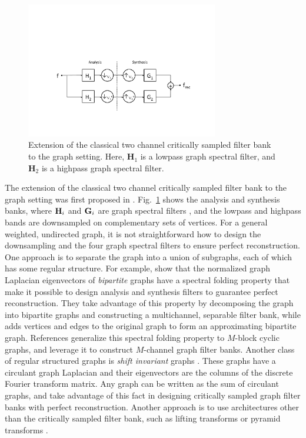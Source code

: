\documentclass[journal, 10pt]{IEEEtran}
\begin{document}
\begin{figure}[t]
\centerline{\includegraphics[width=3.3in]{fig_two_channel_classical}}
\caption{Extension of the classical two channel critically sampled filter bank to the graph setting. Here, $\mathbf{H}_1$ is a lowpass graph spectral filter, and $\mathbf{H}_2$ is a highpass graph spectral filter.}\label{Fig:two_channel}
\end{figure}


The extension of the classical two channel critically sampled filter bank to the graph setting was first proposed in \cite{narang_icip}. Fig.\ \ref{Fig:two_channel} shows the analysis and synthesis banks, where ${\bf H}_i$ and ${\bf G}_i$ are graph spectral filters \cite{shuman2013emerging}, and the lowpass and highpass bands are downsampled on complementary sets of vertices. For a general weighted, undirected graph, it is not straightforward %
how to design the downsampling and the four graph spectral filters to ensure perfect reconstruction. One approach is to separate the graph into a union of subgraphs, each of which has some regular structure. For example, \cite{narang2012perfect,narang_bior_filters} show that the normalized graph Laplacian eigenvectors of \emph{bipartite} graphs have a spectral folding property that make it possible to design analysis and synthesis filters to guarantee perfect reconstruction. They take advantage of this property by decomposing the graph into bipartite graphs and constructing a multichannel, separable filter bank, while \cite{sakiyama} adds vertices and edges to the original graph to form an approximating bipartite graph. References \cite{teke2016,teke2017ii} generalize this spectral folding property to $M$-block cyclic graphs, and leverage it to construct $M$-channel graph filter banks. Another class of regular structured graphs is \emph{shift invariant} graphs \cite[Chapter 5.1]{grady}. These graphs have a circulant graph Laplacian and their eigenvectors are the columns of the discrete Fourier transform matrix. Any graph can be written as the sum of circulant graphs, and \cite{ekambaram_icip,ekambaram2013globalsip,kotzagiannidis2016icassp} take advantage of this fact in designing critically sampled graph filter banks with perfect reconstruction. Another approach is to use architectures other than the critically sampled filter bank, such as lifting transforms \cite{jansen,narang_lifting_graphs} or pyramid transforms \cite{shuman_TSP_multiscale}.
\end{document}
